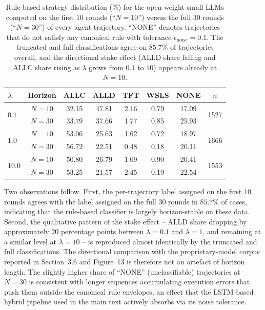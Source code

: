 \documentclass[a4paper,fleqn]{cas-sc}
\begin{document}
\begin{table}[pos=H]
\centering
\caption{Rule-based strategy distribution (\%) for the open-weight small LLMs computed on the first $10$ rounds (``$N{=}10$'') versus the full $30$ rounds (``$N{=}30$'') of every agent trajectory. ``NONE'' denotes trajectories that do not satisfy any canonical rule with tolerance $\epsilon_{\text{noise}}{=}0.1$. The truncated and full classifications agree on $85.7\%$ of trajectories overall, and the directional stake effect (ALLD share falling and ALLC share rising as $\lambda$ grows from $0.1$ to $10$) appears already at $N{=}10$.}
\label{tab:horizon_robustness}
\footnotesize
\begin{tabular}{lccccccc}
\toprule
$\lambda$ & Horizon & ALLC & ALLD & TFT & WSLS & NONE & $n$ \\
\midrule
\multirow{2}{*}{$0.1$}  & $N{=}10$ & 32.15 & 47.81 & 2.16 & 0.79 & 17.09 & \multirow{2}{*}{1527} \\
                        & $N{=}30$ & 33.79 & 37.66 & 1.77 & 0.85 & 25.93 & \\
\midrule
\multirow{2}{*}{$1.0$}  & $N{=}10$ & 53.06 & 25.63 & 1.62 & 0.72 & 18.97 & \multirow{2}{*}{1666} \\
                        & $N{=}30$ & 56.72 & 22.51 & 0.48 & 0.18 & 20.11 & \\
\midrule
\multirow{2}{*}{$10.0$} & $N{=}10$ & 50.80 & 26.79 & 1.09 & 0.90 & 20.41 & \multirow{2}{*}{1553} \\
                        & $N{=}30$ & 53.25 & 21.57 & 2.45 & 0.19 & 22.54 & \\
\bottomrule
\end{tabular}
\end{table}

Two observations follow. First, the per-trajectory label assigned on the first $10$ rounds agrees with the label assigned on the full $30$ rounds in $85.7\%$ of cases, indicating that the rule-based classifier is largely horizon-stable on these data. Second, the qualitative pattern of the stake effect -- ALLD share dropping by approximately $20$ percentage points between $\lambda{=}0.1$ and $\lambda{=}1$, and remaining at a similar level at $\lambda{=}10$ -- is reproduced almost identically by the truncated and full classifications. The directional comparison with the proprietary-model corpus reported in Section~3.6 and Figure~13 is therefore not an artefact of horizon length. The slightly higher share of ``NONE'' (unclassifiable) trajectories at $N{=}30$ is consistent with longer sequences accumulating execution errors that push them outside the canonical rule envelopes, an effect that the LSTM-based hybrid pipeline used in the main text actively absorbs via its noise tolerance.
\end{document}
